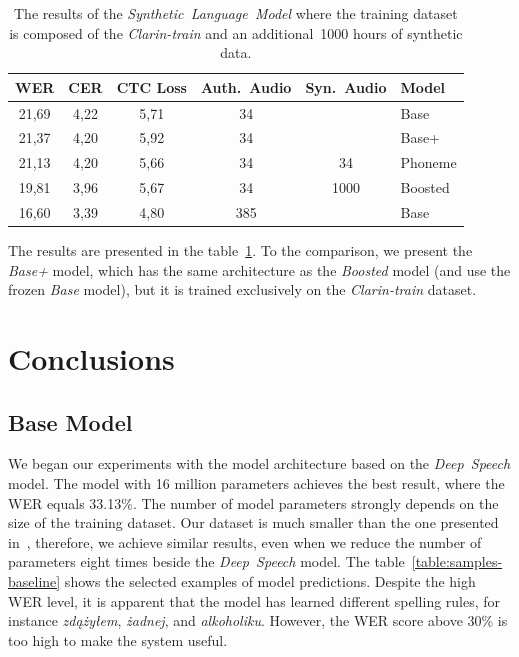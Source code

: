 \begin{table}[h!]
\vspace*{10pt}
\centering
 \begin{tabular}{c c c c c l}
  \toprule
    WER	    & CER	 & CTC Loss	 & Auth.~Audio	  &  Syn.~Audio	    & Model                 \\
    \midrule
    21,69	& 4,22	 & 5,71	     & 34		      &                 & Base                  \\
    21,37	& 4,20	 & 5,92	     & 34		      &                 & Base+                 \\
    21,13	& 4,20	 & 5,66	     & 34	          &  34	            & Phoneme               \\
    19,81	& 3,96	 & 5,67	     & 34	          &  1000	        & Boosted               \\
    \midrule
    16,60	& 3,39	 & 4,80	     & 385            &                 & Base                  \\
  \bottomrule
 \end{tabular}
\caption{
The results of the \textit{Synthetic~Language~Model} where the training dataset is composed of
the \textit{Clarin-train} and an additional~1000 hours of synthetic data.
}
\label{table:limited-dataset}
\end{table}

The results are presented in the table~\ref{table:limited-dataset}.
To the comparison, we present the \textit{Base+} model, which has the same architecture as the \textit{Boosted} model
(and use the frozen \textit{Base} model), but it is trained exclusively on the \textit{Clarin-train} dataset.


\section{Conclusions}\label{sec:conclusions}

\subsection*{Base Model}

We began our experiments with the model architecture based on the \textit{Deep~Speech} model.
The model with 16 million parameters achieves the best result, where the WER equals 33.13\%.
The number of model parameters strongly depends on the size of the training dataset.
Our dataset is much smaller than the one presented in~\cite{hannun2014},
therefore, we achieve similar results, even when we reduce the number of parameters eight times
beside the \textit{Deep~Speech} model.
The table~\ref{table:samples-baseline} shows the selected examples of model predictions.
Despite the high WER level, it is apparent that the model has learned different spelling rules,
for instance \emph{zdążyłem}, \emph{żadnej}, and \emph{alkoholiku}.
However, the WER score above 30\% is too high to make the system useful.

